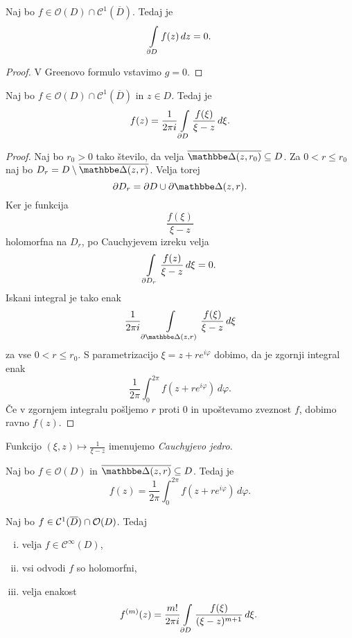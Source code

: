 \begin{posledica}[Cauchy]
Naj bo $f \in \mathcal{O}(D) \cap \mathcal{C}^1(\overline{D})$.
Tedaj je
\[
\int\limits_{\partial D} f(z)\,dz = 0.
\]
\end{posledica}

\begin{proof}
V Greenovo formulo vstavimo $g = 0$.
\end{proof}

\begin{izrek}
Naj bo $f \in \mathcal{O}(D) \cap \mathcal{C}^1(\overline{D})$ in
$z \in D$. Tedaj je
\[
f(z) =
\frac{1}{2 \pi i} \int\limits_{\partial D} \frac{f(\xi)}{\xi - z}\,d\xi.
\]
\end{izrek}

\begin{proof}
Naj bo $r_0 > 0$ tako število, da velja
$\overline{\dsk(z, r_0)} \subseteq D$. Za $0 < r \leq r_0$ naj bo
$D_r = D \setminus \overline{\dsk(z, r)}$. Velja torej
\[
\partial D_r = \partial D \cup \partial \dsk(z, r).
\]
Ker je funkcija
\[
\frac{f(\xi)}{\xi - z}
\]
holomorfna na $D_r$, po Cauchyjevem izreku velja
\[
\int\limits_{\partial D_r} \frac{f(z)}{\xi - z}\,d\xi = 0.
\]
Iskani integral je tako enak
\[
\frac{1}{2 \pi i}
\lint_{\partial \dsk(z, r)} \frac{f(\xi)}{\xi - z}\,d\xi
\]
za vse $0 < r \leq r_0$. S parametrizacijo
$\xi = z + r e^{i \varphi}$ dobimo, da je zgornji integral enak
\[
\frac{1}{2 \pi} \int_0^{2 \pi} f(z + r e^{i \varphi})\,d\varphi.
\]
Če v zgornjem integralu pošljemo $r$ proti $0$ in upoštevamo
zveznost $f$, dobimo ravno $f(z)$.
\end{proof}

\begin{opomba}
Funkcijo $(\xi, z) \mapsto \frac{1}{\xi - z}$ imenujemo
\emph{Cauchyjevo jedro}.
\end{opomba}

\begin{posledica}
Naj bo $f \in \mathcal{O}(D)$ in $\oline{\dsk(z, r)} \subseteq D$.
Tedaj je
\[
f(z) =
\frac{1}{2 \pi} \int_0^{2 \pi} f(z + re^{i \varphi})\,d\varphi.
\]
\end{posledica}

\begin{posledica}
Naj bo $f \in \mathcal{C}^1(\overline{D}) \cap \mathcal{O}(D)$. Tedaj

\begin{enumerate}[i)]
\item velja $f \in \mathcal{C}^\infty(D)$,
\item vsi odvodi $f$ so holomorfni,
\item velja enakost
\[
f^{(m)}(z) = \frac{m!}{2 \pi i}
\int\limits_{\partial D} \frac{f(\xi)}{(\xi - z)^{m+1}}\,d\xi.
\]
\end{enumerate}
\end{posledica}

